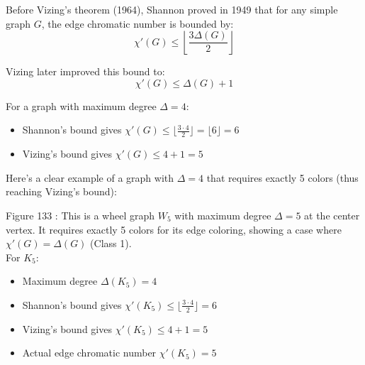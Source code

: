 \documentclass{article}
\theoremstyle{definition}
\begin{document}
Before Vizing's theorem (1964), Shannon proved in 1949 that for any simple graph $G$, the edge chromatic number is bounded by:
\begin{equation}
\chi'(G) \leq \left\lfloor\frac{3\Delta(G)}{2}\right\rfloor
\end{equation}

Vizing later improved this bound to:
\begin{equation}
\chi'(G) \leq \Delta(G) + 1
\end{equation}

For a graph with maximum degree $\Delta = 4$:
\begin{itemize}
    \item Shannon's bound gives $\chi'(G) \leq \lfloor\frac{3 \cdot 4}{2}\rfloor = \lfloor 6 \rfloor = 6$
    \item Vizing's bound gives $\chi'(G) \leq 4 + 1 = 5$
\end{itemize}

Here's a clear example of a graph with $\Delta = 4$ that requires exactly 5 colors (thus reaching Vizing's bound):

\begin{center}
\end{center}
\small Figure 133 : This is a wheel graph $W_5$ with maximum degree $\Delta = 5$ at the center vertex. It requires exactly 5 colors for its edge coloring, showing a case where $\chi'(G) = \Delta(G)$ (Class 1).
\\
For $K_5$:
\begin{itemize}
    \item Maximum degree $\Delta(K_5) = 4$
    \item Shannon's bound gives $\chi'(K_5) \leq \lfloor\frac{3 \cdot 4}{2}\rfloor = 6$
    \item Vizing's bound gives $\chi'(K_5) \leq 4 + 1 = 5$
    \item Actual edge chromatic number $\chi'(K_5) = 5$
\end{itemize}
\end{document}
